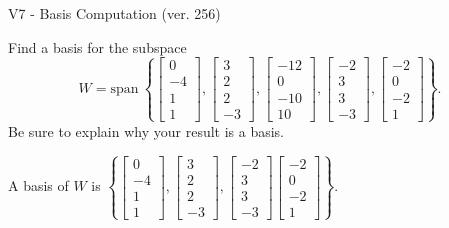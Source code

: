 \begin{exercise}
  \begin{exerciseTitle}V7 - Basis Computation (ver. 256)\end{exerciseTitle}
  \begin{exerciseStatement}
    Find a basis for the subspace 
\[W=\mathrm{span}\ \left\{\left[\begin{array}{r}
0 \\
-4 \\
1 \\
1
\end{array}\right] , \left[\begin{array}{r}
3 \\
2 \\
2 \\
-3
\end{array}\right] , \left[\begin{array}{r}
-12 \\
0 \\
-10 \\
10
\end{array}\right] , \left[\begin{array}{r}
-2 \\
3 \\
3 \\
-3
\end{array}\right] , \left[\begin{array}{r}
-2 \\
0 \\
-2 \\
1
\end{array}\right]\right\}.\]
 Be sure to explain why your result is a basis.


  \end{exerciseStatement}
  \begin{exerciseAnswer}
   A basis of \(W\) is  \(\left\{\left[\begin{array}{r}
0 \\
-4 \\
1 \\
1
\end{array}\right] , \left[\begin{array}{r}
3 \\
2 \\
2 \\
-3
\end{array}\right] , \left[\begin{array}{r}
-2 \\
3 \\
3 \\
-3
\end{array}\right] \left[\begin{array}{r}
-2 \\
0 \\
-2 \\
1
\end{array}\right]\right\}\).
  


  \end{exerciseAnswer}
\end{exercise}